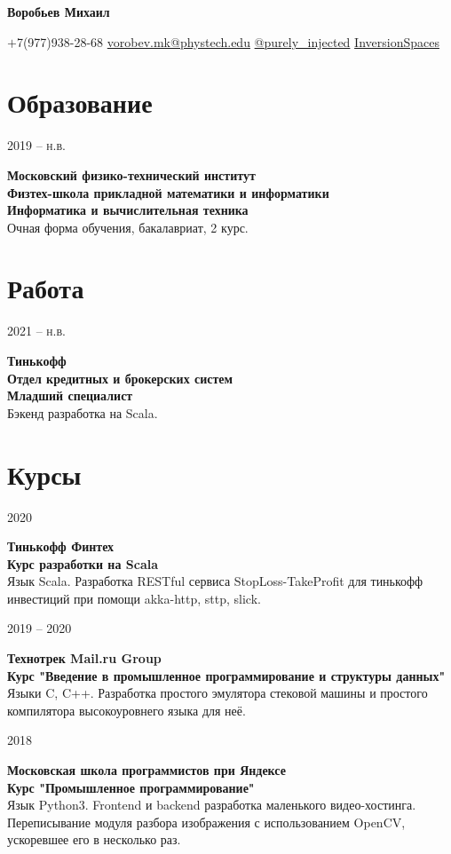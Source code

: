 \documentclass{article}
\makeatletter
\renewcommand{\maketitle}{
    \Huge
    \begin{center}
        \textbf{Воробьев Михаил}
    \end{center}

    \small
    \begin{center}
    \faMobile \hspace{0.1cm} $\boldsymbol{+}$7(977)938-28-68 
    \hfill
    \faEnvelope \hspace{0.1cm} \href{mailto:vorobev.mk@phystech.edu}{vorobev.mk@phystech.edu}
    \hfill
    \faPaperPlane \hspace{0.1cm} \href{https://t.me/purely_injected}{@purely\_injected}
    \hfill
    \faGithub \hspace{0.1cm} \href{https://github.com/InversionSpaces}{InversionSpaces}
    \end{center}
}
\newcommand{\entry}[3]{
    \begin{minipage}[t]{.11\linewidth}
        \hfill \textsc{#1}
    \end{minipage}
    \hfill\vline\hfill
    \begin{minipage}[t]{.80\linewidth}
        \textbf{#2} \\
        \footnotesize{#3}
    \end{minipage}
}
\makeatother
\begin{document}
    \maketitle
    \small
    
    \section{Образование}
        \entry {2019 -- н.в.}
        {Московский физико-технический институт\\
         Физтех-школа прикладной математики и информатики\\
         Информатика и вычислительная техника}
        {Очная форма обучения, бакалавриат, 2 курс.}

    \section{Работа}
        \entry { 2021 -- н.в.}
        {Тинькофф \\
         Отдел кредитных и брокерских систем \\
         Младший специалист}
        {Бэкенд разработка на Scala.}   

    \section{Курсы}
        \entry {2020 \\
            }
            {Тинькофф Финтех \\
            Курс разработки на Scala }
            { Язык Scala. Разработка RESTful сервиса StopLoss-TakeProfit для тинькофф инвестиций при помощи akka-http, sttp, slick. }
        
        \vspace{.1cm}
        
        \entry {2019 -- 2020 \\
        }
        {Технотрек Mail.ru Group \\
        Курс "Введение в промышленное программирование и структуры данных"}
        { Языки C, C++. Разработка простого эмулятора стековой машины и простого компилятора высокоуровнего языка для неё. }
          
        \vspace{.1cm}
        
        \entry {2018 \\
        }
        {Московская школа программистов при Яндексе \\
        Курс "Промышленное программирование"}
        { Язык Python3. Frontend и backend разработка маленького видео-хостинга. Переписывание модуля разбора изображения с использованием OpenCV, ускоревшее его в несколько раз. }  
        
\end{document}
